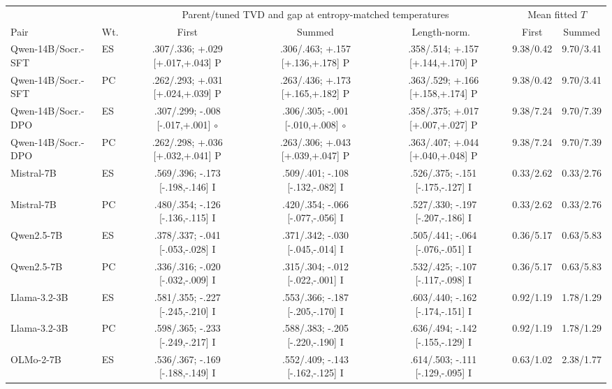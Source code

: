\begin{table}[t]
\centering\scriptsize
\setlength{\tabcolsep}{2.5pt}
\begin{tabular}{@{}llccc@{\hspace{6pt}}cc@{}}
\toprule
& & \multicolumn{3}{c}{Parent/tuned TVD and gap at entropy-matched temperatures} & \multicolumn{2}{c}{Mean fitted $T$} \\
\cmidrule(lr){3-5}\cmidrule(l){6-7}
Pair & Wt. & First & Summed & Length-norm.\ & First & Summed \\
\midrule
Qwen-14B/Socr.-SFT & ES & .307/.336; +.029 [+.017,+.043] P & .306/.463; +.157 [+.136,+.178] P & .358/.514; +.157 [+.144,+.170] P & 9.38/0.42 & 9.70/3.41 \\
Qwen-14B/Socr.-SFT & PC & .262/.293; +.031 [+.024,+.039] P & .263/.436; +.173 [+.165,+.182] P & .363/.529; +.166 [+.158,+.174] P & 9.38/0.42 & 9.70/3.41 \\
Qwen-14B/Socr.-DPO & ES & .307/.299; -.008 [-.017,+.001] $\circ$ & .306/.305; -.001 [-.010,+.008] $\circ$ & .358/.375; +.017 [+.007,+.027] P & 9.38/7.24 & 9.70/7.39 \\
Qwen-14B/Socr.-DPO & PC & .262/.298; +.036 [+.032,+.041] P & .263/.306; +.043 [+.039,+.047] P & .363/.407; +.044 [+.040,+.048] P & 9.38/7.24 & 9.70/7.39 \\
Mistral-7B & ES & .569/.396; -.173 [-.198,-.146] I & .509/.401; -.108 [-.132,-.082] I & .526/.375; -.151 [-.175,-.127] I & 0.33/2.62 & 0.33/2.76 \\
Mistral-7B & PC & .480/.354; -.126 [-.136,-.115] I & .420/.354; -.066 [-.077,-.056] I & .527/.330; -.197 [-.207,-.186] I & 0.33/2.62 & 0.33/2.76 \\
Qwen2.5-7B & ES & .378/.337; -.041 [-.053,-.028] I & .371/.342; -.030 [-.045,-.014] I & .505/.441; -.064 [-.076,-.051] I & 0.36/5.17 & 0.63/5.83 \\
Qwen2.5-7B & PC & .336/.316; -.020 [-.032,-.009] I & .315/.304; -.012 [-.022,-.001] I & .532/.425; -.107 [-.117,-.098] I & 0.36/5.17 & 0.63/5.83 \\
Llama-3.2-3B & ES & .581/.355; -.227 [-.245,-.210] I & .553/.366; -.187 [-.205,-.170] I & .603/.440; -.162 [-.174,-.151] I & 0.92/1.19 & 1.78/1.29 \\
Llama-3.2-3B & PC & .598/.365; -.233 [-.249,-.217] I & .588/.383; -.205 [-.220,-.190] I & .636/.494; -.142 [-.155,-.129] I & 0.92/1.19 & 1.78/1.29 \\
OLMo-2-7B & ES & .536/.367; -.169 [-.188,-.149] I & .552/.409; -.143 [-.162,-.125] I & .614/.503; -.111 [-.129,-.095] I & 0.63/1.02 & 2.38/1.77 \\

\end{tabular}
\end{table}
